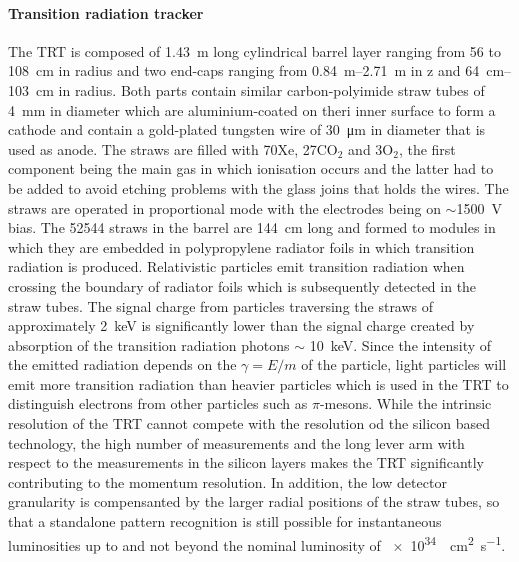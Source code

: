 \paragraph{Transition radiation tracker}
The TRT\cite{atlas_trt} is composed of \SI{1.43}{\meter} long cylindrical barrel layer ranging from 56 to \SI{108}{\centi\meter} in radius and two end-caps ranging from \SIrange{0.84}{2.71}{\meter} in z and \SIrange{64}{103}{\centi\meter} in radius.
Both parts contain similar carbon-polyimide straw tubes of \SI{4}{\milli\meter} in diameter  which are aluminium-coated on theri inner surface to form a cathode and contain a gold-plated tungsten wire of \SI{30}{\micro\meter} in diameter that is used as anode. The straws are filled with 70\percent Xe, 27\percent CO$_2$ and 3\percent O$_2$, the first component being the main gas in which ionisation occurs and the latter had to be added to avoid etching problems with the glass joins that holds the wires. The straws are operated in proportional mode with the electrodes being on $\sim$\SI{1500}{\volt} bias. The 52544 straws in the barrel are \SI{144}{\centi\meter} long and formed to modules in which they are embedded in polypropylene radiator foils in which transition radiation is produced.
Relativistic particles emit transition radiation when crossing the boundary of radiator foils which is subsequently detected in the straw tubes. The signal charge from particles traversing the straws of approximately \SI{2}{\keV} is significantly lower than the signal charge created by absorption of the transition radiation photons $\sim$ \SI{10}{\keV}. Since the intensity of the emitted radiation depends on the $\gamma = E/m$ of the particle, light particles will emit more transition radiation than heavier particles which is used in the TRT to distinguish electrons from other particles such as $\pi$-mesons.
While the intrinsic resolution of the TRT cannot compete with the resolution od the silicon based technology, the high number of measurements and the long lever arm with respect to the measurements in the silicon layers makes the TRT significantly contributing to the momentum resolution. In addition, the low detector granularity is compensanted by the larger  radial positions of the straw tubes, so that a standalone pattern recognition is still possible for instantaneous luminosities up to and not beyond the nominal luminosity of \SI{e34}{\per\square\centi\meter\per\second}.

